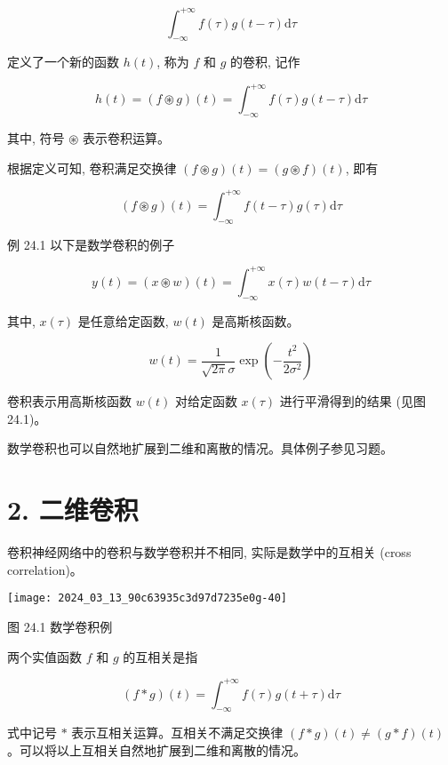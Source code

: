 \documentclass[10pt]{article}
\begin{document}
\begin{CJK*}{UTF8}{bsmi}
$$
\int_{-\infty}^{+\infty} f(\tau) g(t-\tau) \mathrm{d} \tau
$$

定义了一个新的函数 $h(t)$, 称为 $f$ 和 $g$ 的卷积, 记作


\begin{equation*}
h(t)=(f \circledast g)(t)=\int_{-\infty}^{+\infty} f(\tau) g(t-\tau) \mathrm{d} \tau \tag{24.1}
\end{equation*}


其中, 符号 $\circledast$ 表示卷积运算。

根据定义可知, 卷积满足交换律 $(f \circledast g)(t)=(g \circledast f)(t)$, 即有


\begin{equation*}
(f \circledast g)(t)=\int_{-\infty}^{+\infty} f(t-\tau) g(\tau) \mathrm{d} \tau \tag{24.2}
\end{equation*}


例 24.1 以下是数学卷积的例子

$$
y(t)=(x \circledast w)(t)=\int_{-\infty}^{+\infty} x(\tau) w(t-\tau) \mathrm{d} \tau
$$

其中, $x(\tau)$ 是任意给定函数, $w(t)$ 是高斯核函数。

$$
w(t)=\frac{1}{\sqrt{2 \pi} \sigma} \exp \left(-\frac{t^{2}}{2 \sigma^{2}}\right)
$$

卷积表示用高斯核函数 $w(t)$ 对给定函数 $x(\tau)$ 进行平滑得到的结果 (见图 24.1)。

数学卷积也可以自然地扩展到二维和离散的情况。具体例子参见习题。

\section*{2. 二维卷积}
卷积神经网络中的卷积与数学卷积并不相同, 实际是数学中的互相关 (cross correlation)。

\begin{center}
\texttt{[image: 2024\_03\_13\_90c63935c3d97d7235e0g-40]}
\end{center}

图 24.1 数学卷积例

两个实值函数 $f$ 和 $g$ 的互相关是指


\begin{equation*}
(f * g)(t)=\int_{-\infty}^{+\infty} f(\tau) g(t+\tau) \mathrm{d} \tau \tag{24.3}
\end{equation*}


式中记号 $*$ 表示互相关运算。互相关不满足交换律 $(f * g)(t) \neq(g * f)(t)$ 。可以将以上互相关自然地扩展到二维和离散的情况。


\end{CJK*}
\end{document}
